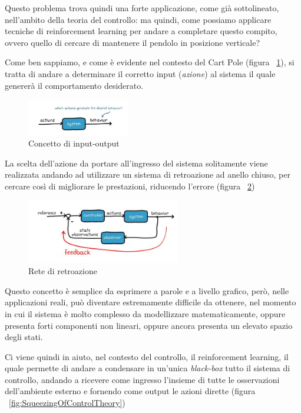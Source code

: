 Questo problema trova quindi una forte applicazione, come già sottolineato, nell'ambito della teoria del controllo: ma quindi, come possiamo applicare tecniche di reinforcement learning per andare a completare questo compito, ovvero quello di cercare di mantenere il pendolo in posizione verticale?

Come ben sappiamo, e come è evidente nel contesto del Cart Pole (figura ~\ref{fig:ActionBehaviour}), si tratta di andare a determinare il corretto input (\textit{azione}) al sistema il quale genererà il comportamento desiderato.

\begin{figure}[!h]
	\centering
	\includegraphics[width=0.4\textwidth]{Immagini/In_Out.JPG}
	\caption{Concetto di input-output}
	\label{fig:ActionBehaviour}
\end{figure}

La scelta dell'azione da portare all'ingresso del sistema solitamente viene realizzata andando ad utilizzare un sistema di retroazione ad anello chiuso, per cercare così di migliorare le prestazioni, riducendo l'errore (figura ~\ref{fig:ControlTheory})

\begin{figure}[!h]
	\centering
	\includegraphics[width=0.6\textwidth]{Immagini/ControlTheory.JPG}
	\caption{Rete di retroazione}
	\label{fig:ControlTheory}
\end{figure}
Questo concetto è semplice da esprimere a parole e a livello grafico, però, nelle applicazioni reali, può diventare estremamente difficile da ottenere, nel momento in cui il sistema è molto complesso da modellizzare matematicamente, oppure presenta forti componenti non lineari, oppure ancora presenta un elevato spazio degli stati.

Ci viene quindi in aiuto, nel contesto del controllo, il reinforcement learning, il quale permette di andare a condensare in un'unica \textit{black-box} tutto il sistema di controllo, andando a ricevere come ingresso l'insieme di tutte le osservazioni dell'ambiente esterno e fornendo come output le azioni dirette (figura ~\ref{fig:SqueezingOfControlTheory})


